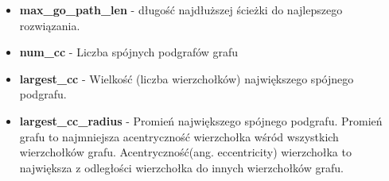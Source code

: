 \begin{itemize}
      \item \textbf{max\_go\_path\_len} - długość najdłuższej ścieżki do najlepszego rozwiązania.
      \item \textbf{num\_cc} - Liczba spójnych podgrafów grafu
      \item \textbf{largest\_cc} - Wielkość (liczba wierzchołków) największego spójnego podgrafu.
      \item \textbf{largest\_cc\_radius} - Promień największego spójnego podgrafu. Promień grafu to najmniejsza acentryczność wierzchołka wśród wszystkich wierzchołków grafu.
            Acentryczność(ang. eccentricity) wierzchołka to największa z odległości wierzchołka do innych wierzchołków grafu.
\end{itemize}


